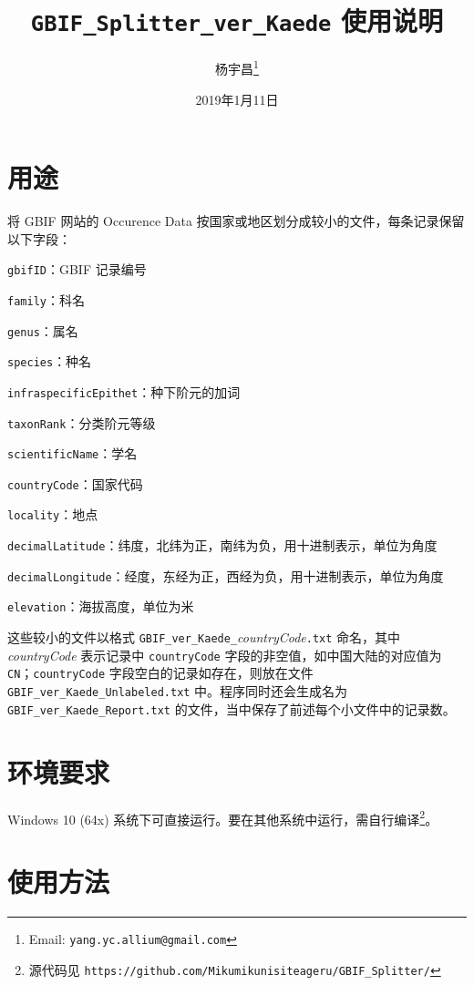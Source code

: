 \documentclass[a4paper, utf-8]{ctexart}
\title{\texttt{GBIF_Splitter_ver_Kaede} 使用说明}
\author{杨宇昌\footnote{Email: \texttt{yang.yc.allium@gmail.com}}}
\date{2019年1月11日}
\begin{document}
\maketitle

\section{用途}

将 GBIF 网站的 Occurence Data 按国家或地区划分成较小的文件，每条记录保留以下字段：
\begin{itemize*}
	\item \verb|gbifID|：GBIF 记录编号
	\item \verb|family|：科名
	\item \verb|genus|：属名
	\item \verb|species|：种名
	\item \verb|infraspecificEpithet|：种下阶元的加词
	\item \verb|taxonRank|：分类阶元等级
	\item \verb|scientificName|：学名
	\item \verb|countryCode|：国家代码
	\item \verb|locality|：地点
	\item \verb|decimalLatitude|：纬度，北纬为正，南纬为负，用十进制表示，单位为角度
	\item \verb|decimalLongitude|：经度，东经为正，西经为负，用十进制表示，单位为角度
	\item \verb|elevation|：海拔高度，单位为米
\end{itemize*}
这些较小的文件以格式 \verb|GBIF_ver_Kaede_|\textit{countryCode}\verb|.txt| 命名，其中 \textit{countryCode} 表示记录中 \verb|countryCode| 字段的非空值，如中国大陆的对应值为 \verb|CN|；\verb|countryCode| 字段空白的记录如存在，则放在文件 \verb|GBIF_ver_Kaede_Unlabeled.txt| 中。程序同时还会生成名为 \verb|GBIF_ver_Kaede_Report.txt| 的文件，当中保存了前述每个小文件中的记录数。

\section{环境要求}

Windows 10 (64x) 系统下可直接运行。要在其他系统中运行，需自行编译\footnote{源代码见 \texttt{https://github.com/Mikumikunisiteageru/GBIF_Splitter/}}。


\section{使用方法}
\end{document}
